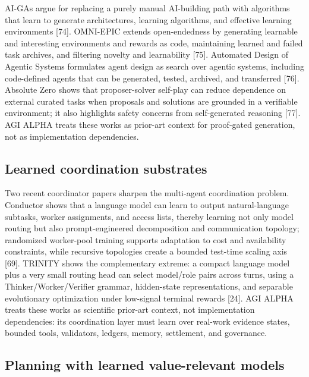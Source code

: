 AI-GAs argue for replacing a purely manual AI-building path with
algorithms that learn to generate architectures, learning algorithms,
and effective learning environments {[}74{]}. OMNI-EPIC extends
open-endedness by generating learnable and interesting environments and
rewards as code, maintaining learned and failed task archives, and
filtering novelty and learnability {[}75{]}. Automated Design of Agentic
Systems formulates agent design as search over agentic systems,
including code-defined agents that can be generated, tested, archived,
and transferred {[}76{]}. Absolute Zero shows that proposer-solver
self-play can reduce dependence on external curated tasks when proposals
and solutions are grounded in a verifiable environment; it also
highlights safety concerns from self-generated reasoning {[}77{]}. AGI
ALPHA treats these works as prior-art context for proof-gated
generation, not as implementation dependencies.

\subsection{Learned coordination
substrates}\label{learned-coordination-substrates}

Two recent coordinator papers sharpen the multi-agent coordination
problem. Conductor shows that a language model can learn to output
natural-language subtasks, worker assignments, and access lists, thereby
learning not only model routing but also prompt-engineered decomposition
and communication topology; randomized worker-pool training supports
adaptation to cost and availability constraints, while recursive
topologies create a bounded test-time scaling axis {[}69{]}. TRINITY
shows the complementary extreme: a compact language model plus a very
small routing head can select model/role pairs across turns, using a
Thinker/Worker/Verifier grammar, hidden-state representations, and
separable evolutionary optimization under low-signal terminal rewards
{[}24{]}. AGI ALPHA treats these works as scientific prior-art context,
not implementation dependencies: its coordination layer must learn over
real-work evidence states, bounded tools, validators, ledgers, memory,
settlement, and governance.

\subsection{Planning with learned value-relevant
models}\label{planning-with-learned-value-relevant-models}

